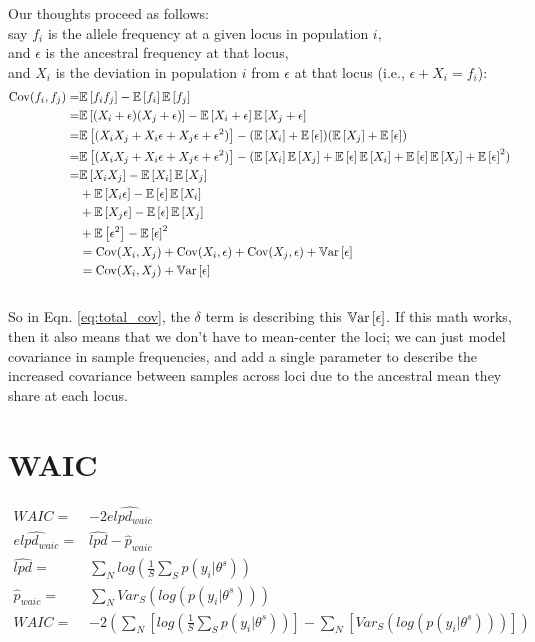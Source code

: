 \documentclass[12pt]{article}
\newcommand{\e}[1]{{\mathbb E}\left[ #1 \right]}
\newcommand{\var}[1]{{\mathbb V \textnormal{ar}}\left[ #1 \right]}
\begin{document}
Our thoughts proceed as follows:\\
say $f_i$ is the allele frequency at a given locus in population $i$,\\
and $\epsilon$ is the ancestral frequency at that locus,\\
and $X_i$ is the deviation in population $i$ from $\epsilon$ at that locus (i.e., $\epsilon + X_i = f_i$):\\
\begin{align}
\text{Cov}(f_i,f_j) =& \e{f_if_j} - \e{f_i}\e{f_j}	\notag\\
			=& \e{( X_i + \epsilon) ( X_j +
                         		 \epsilon)} - \e{  X_i+ \epsilon}\e{ X_j+ \epsilon} \notag\\
			=& \e{( X_i  X_j +  X_i\epsilon +  X_j\epsilon + \epsilon^2)} -(\e{ X_i}+ \e{\epsilon})(\e{ X_j}+ \e{\epsilon}) \notag\\
			=& \e{( X_i  X_j +  X_i\epsilon +  X_j\epsilon + \epsilon^2)} -
				(\e{ X_i}\e{ X_j}+ \e{\epsilon}\e{ X_i}+ \e{\epsilon}\e{ X_j} + \e{\epsilon}^2) \notag\\
			=& \e{X_i  X_j} - \e{ X_i}\e{ X_j} \\ \notag 
			     &+ \e{X_i\epsilon} - \e{\epsilon}\e{ X_i} \\ \notag 
			     &+\e{X_j\epsilon} - \e{\epsilon}\e{ X_j} \\ \notag 
			     &+\e{\epsilon^2} - \e{\epsilon}^2  \notag\\
			&= \text{Cov}({ X_i,X_j})  + \text{Cov}(X_i,\epsilon) + 
				\text{Cov}(X_j,\epsilon) + \var{\epsilon} \notag\\
			&= \text{Cov}({ X_i,X_j}) + \var{\epsilon}
\end{align}
\\

So in Eqn. \eqref{eq:total_cov}, the $\delta$ term is describing this $\var{\epsilon}$.
If this math works, then it also means that we don't have to mean-center the loci;
we can just model covariance in sample frequencies, 
and add a single parameter to describe the increased covariance between samples across loci 
due to the ancestral mean they share at each locus.

\section{WAIC}
\begin{align}
WAIC =& -2 \widehat{elpd_{waic}}\\
\widehat{elpd_{waic}} =& \widehat{lpd} - \hat{p}_{waic}\\
\widehat{lpd} =& \sum\limits_N log\left(\frac{1}{S}\sum\limits_S p(y_i | \theta^s)	\right)\\
\hat{p}_{waic} =& \sum\limits_N Var_S\left( log \left( p(y_i | \theta^s) \right)	\right)\\
WAIC =& -2 \left( \sum\limits_N \left[ log\left(\frac{1}{S}\sum\limits_S p(y_i | \theta^s)	\right) \right]-
	\sum\limits_N \left[ Var_S\left( log \left( p(y_i | \theta^s) \right)	\right) \right]	\right)
\end{align}
\end{document}
